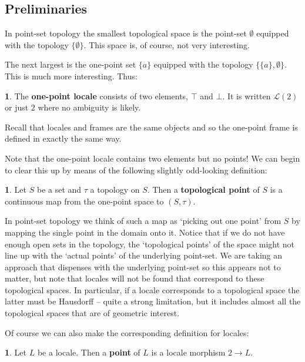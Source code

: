 \documentclass[oneside,english]{amsbook}
\numberwithin{section}{chapter}
\theoremstyle{plain}
\theoremstyle{definition}
\newtheorem{defn}[thm]{\protect\definitionname}
\providecommand{\definitionname}{Definition}
\begin{document}
\subsection{Preliminaries}

In point-set topology the smallest topological space is the point-set $\emptyset$ equipped with the topology $\{\emptyset\}$. This space is, of course, not very interesting. 

The next largest is the one-point set $\{a\}$ equipped with the topology $\{\{a\}, \emptyset\}$. This is much more interesting. Thus:

\begin{defn}
	The \textbf{one-point locale} consists of two elements, $\top$ and $\bot$. It is written $\mathscr{L}(2)$ or just $2$ where no ambiguity is likely.
\end{defn}

Recall that locales and frames are the same objects and so the one-point frame is defined in exactly the same way.

Note that the one-point locale contains two elements but no points! We can begin to clear this up by means of the following slightly odd-looking definition:

\begin{defn}
	Let $S$ be a set and $\tau$ a topology on $S$. Then a \textbf{topological point} of $S$ is a continuous map from the one-point space to $(S, \tau)$.
\end{defn}

In point-set topology we think of such a map as `picking out one point' from $S$ by mapping the single point in the domain onto it. Notice that if we do not have enough open sets in the topology, the `topological points' of the space might not line up with the `actual points' of the underlying point-set. We are taking an approach that dispenses with the underlying point-set so this appears not to matter, but note that locales will not be found that correspond to these topological spaces. In particular, if a locale corresponds to a topological space the latter must be Hausdorff -- quite a strong limitation, but it includes almost all the topological spaces that are of geometric interest.

Of course we can also make the corresponding definition for locales:

\begin{defn}
	Let $L$ be a locale. Then a \textbf{point} of $L$ is a locale morphism $2\to L$.
\end{defn}
\end{document}
